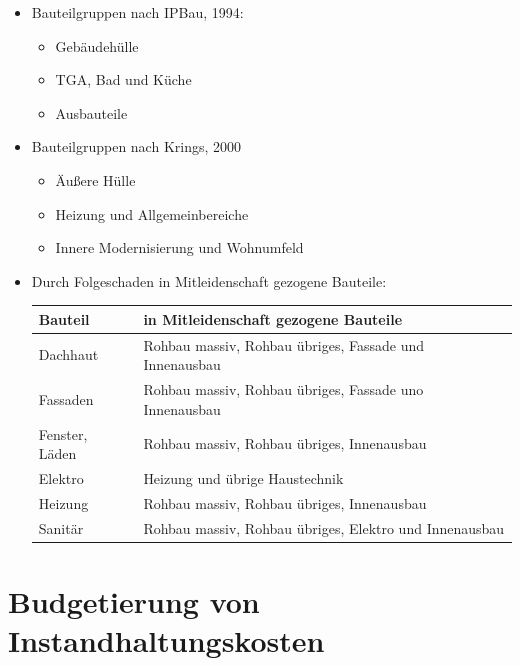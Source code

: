\documentclass[fleqn,twoside,dvipsnames]{article}
\begin{document}
\begin{itemize}
            \item Bauteilgruppen nach IPBau, 1994:
                \begin{itemize}
                    \item Gebäudehülle
                    \item TGA, Bad und Küche
                    \item Ausbauteile
                \end{itemize}
            \item Bauteilgruppen nach Krings, 2000
                \begin{itemize}
                    \item Äußere Hülle
                    \item Heizung und Allgemeinbereiche
                    \item Innere Modernisierung und Wohnumfeld
                \end{itemize}
            \item Durch Folgeschaden in Mitleidenschaft gezogene Bauteile:\\ \vspace{3mm}
                \begin{tabular}{|l|l|}
                \hline \textbf{Bauteil} & \textbf{in Mitleidenschaft gezogene Bauteile} \\
                \hline Dachhaut & Rohbau massiv, Rohbau übriges, Fassade und Innenausbau\\
                \hline Fassaden & Rohbau massiv, Rohbau übriges, Fassade uno Innenausbau \\
                \hline Fenster, Läden & Rohbau massiv, Rohbau übriges, Innenausbau \\
                \hline Elektro & Heizung und übrige Haustechnik \\
                \hline Heizung & Rohbau massiv, Rohbau übriges, Innenausbau \\
                \hline Sanitär & Rohbau massiv, Rohbau übriges, Elektro und Innenausbau \\
                \hline
                \end{tabular}
        \end{itemize}

\newpage
    
\section{Budgetierung von Instandhaltungskosten} \label{4Budgetierung} 
\end{document}
